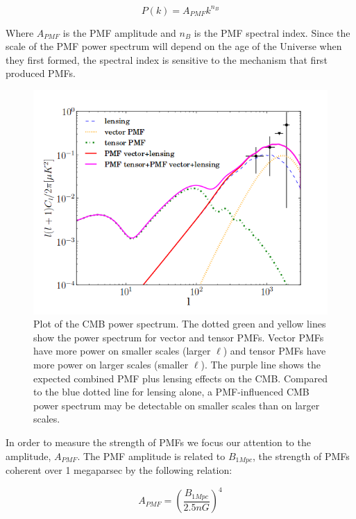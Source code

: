 \begin{equation}
\label{eqn:pmfpower}
P(k) = A_{PMF}k^{n_B}
\end{equation}

Where $A_{PMF}$ is the PMF amplitude and $n_{B}$ is the PMF spectral index. Since the scale of the PMF power spectrum will depend on the age of the Universe when they first formed, the spectral index is sensitive to the mechanism that first produced PMFs.

\begin{figure}[h]
\label{fig:pmfpower}
\centering
\includegraphics[scale=0.7]{images/PMFpower.png} 
\caption{Plot of the CMB power spectrum. The dotted green and yellow lines show the power spectrum for vector and tensor PMFs. Vector PMFs have more power on smaller scales (larger $\ell$) and tensor PMFs have more power on larger scales (smaller $\ell$). The purple line shows the expected combined PMF plus lensing effects on the CMB. Compared to the blue dotted line for lensing alone, a PMF-influenced CMB power spectrum may be detectable on smaller scales than on larger scales.}
\end{figure}

In order to measure the strength of PMFs we focus our attention to the amplitude, $A_{PMF}$. The PMF amplitude is related to $B_{1Mpc}$, the strength of PMFs coherent over 1 megaparsec by the following relation:

\begin{equation}
\label{eqn:ab}
A_{PMF} = (\frac{B_{1Mpc}}{2.5nG})^4
\end{equation}

